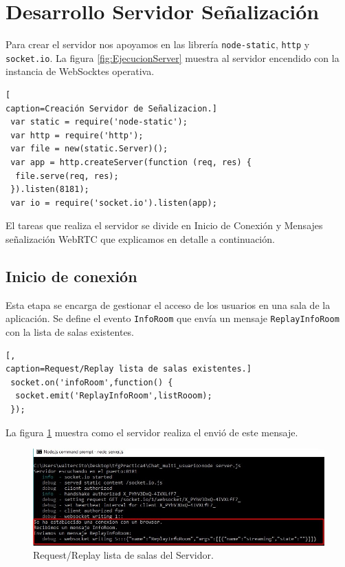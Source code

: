 \section{Desarrollo Servidor Señalización}
Para crear el servidor nos apoyamos en las librería \texttt{node-static}, \texttt{http} y \texttt{socket.io}. La figura \ref{fig:EjecucionServer} muestra al servidor encendido con la instancia de WebSocktes operativa.
\begin{lstlisting}[
caption=Creación Servidor de Señalizacion.]
 var static = require('node-static');
 var http = require('http');
 var file = new(static.Server)();
 var app = http.createServer(function (req, res) {
  file.serve(req, res);
 }).listen(8181);
 var io = require('socket.io').listen(app);
\end{lstlisting}

El tareas que realiza el servidor se divide en Inicio de Conexión y Mensajes señalización WebRTC que explicamos en detalle a continuación. 
\subsection*{Inicio de conexión}
Esta etapa se encarga de gestionar el acceso de los usuarios en una sala de la aplicación.  Se define el evento \texttt{InfoRoom} que envía un mensaje \texttt{ReplayInfoRoom} con la lista de salas existentes.
\begin{lstlisting}[,
caption=Request/Replay lista de salas existentes.]
 socket.on('infoRoom',function() {
  socket.emit('ReplayInfoRoom',listRooom);
 });
\end{lstlisting}
La figura \ref{fig:EjecucionInfoRoom} muestra como el servidor realiza el envió de este mensaje.
\begin{figure}[!h]
\begin{center}
   \includegraphics[width=0.8\linewidth]{Figures/InfoRoomServer}
	\decoRule
	\caption[Request/Replay Salas Servidor]{Request/Replay lista de salas del Servidor.}
\label{fig:EjecucionInfoRoom}
\end{center}
\end{figure}


